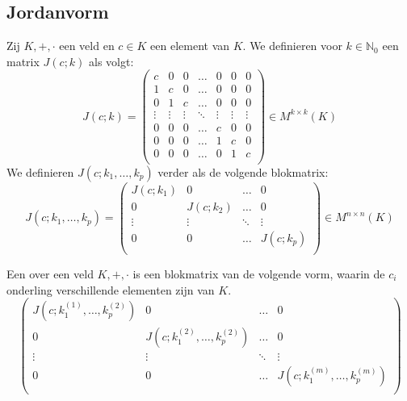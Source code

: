 \documentclass[main.tex]{subfiles}
\begin{document}
\subsection{Jordanvorm}
\label{sec:jordanvorm}

\begin{de}
  Zij $K,+,\cdot$ een veld en $c\in K$ een element van $K$.
  We definieren voor $k\in \mathbb{N}_{0}$ een matrix $J(c;k)$ als volgt:
  \[
  J(c;k) = 
  \begin{pmatrix}
    c & 0 & 0 & \hdots & 0 & 0 & 0\\
    1 & c & 0 & \hdots & 0 & 0 & 0\\
    0 & 1 & c & \hdots & 0 & 0 & 0\\
    \vdots & \vdots & \vdots & \ddots & \vdots & \vdots & \vdots\\
    0 & 0 & 0 & \hdots & c & 0 & 0\\
    0 & 0 & 0 & \hdots & 1 & c & 0\\
    0 & 0 & 0 & \hdots & 0 & 1 & c\\
  \end{pmatrix}
  \in M^{k\times k}(K)
  \]
  We definieren $J(c;k_{1},\dotsc,k_{p})$ verder als de volgende blokmatrix:
  \[
  J(c;k_{1},\dotsc,k_{p}) = 
  \begin{pmatrix}
    J(c;k_{1}) & 0 & \hdots & 0\\
    0 & J(c;k_{2}) & \hdots & 0\\
    \vdots & \vdots & \ddots & \vdots\\
    0 & 0 & \hdots & J(c;k_{p})\\
  \end{pmatrix}
  \in M^{n\times n}(K)
  \]
\end{de}

\begin{de}
  Een  over een veld $K,+,\cdot$ is een blokmatrix van de volgende vorm, waarin de $c_{i}$ onderling verschillende elementen zijn van $K$.
  \[
  \begin{pmatrix}
    J(c;k_{1}^{(1)},\dotsc,k_{p}^{(2)}) & 0 & \hdots & 0\\
    0 & J(c;k_{1}^{(2)},\dotsc,k_{p}^{(2)}) & \hdots & 0\\
    \vdots & \vdots & \ddots & \vdots\\
    0 & 0 & \hdots & J(c;k_{1}^{(m)},\dotsc,k_{p}^{(m)})\\
  \end{pmatrix}
  \]
\end{de}
\end{document}
